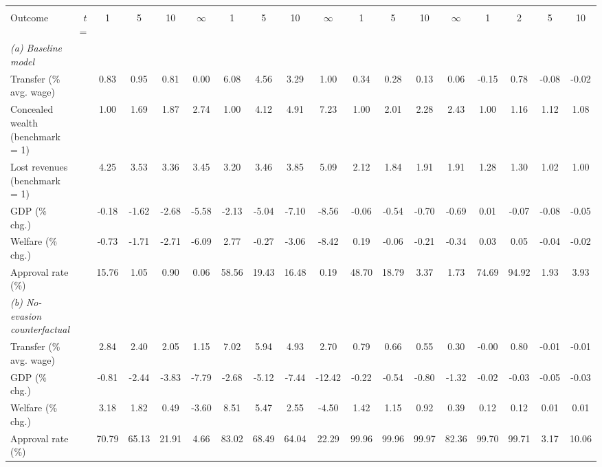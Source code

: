 \footnotesize
\renewcommand{\arraystretch}{1.2}
\begin{tabular}{lrcccccccccccccccc}
\toprule
& & &  &  & \\
\cmidrule(rl){3-6}\cmidrule(rl){7-10}\cmidrule(rl){11-14}\cmidrule(rl){15-18}
Outcome & $t$ = & 1 & 5 & 10 & $\infty$& 1 & 5 & 10 & $\infty$& 1 & 5 & 10 & $\infty$& 1 & 2 & 5 & 10\\
\midrule
\textit{(a) Baseline model}&&&&&&&&&&&&&&&&&\\
Transfer (\% avg. wage) & &0.83&0.95&0.81&0.00&6.08&4.56&3.29&1.00&0.34&0.28&0.13&0.06&-0.15&0.78&-0.08&-0.02\\
Concealed wealth (benchmark = 1) & &1.00&1.69&1.87&2.74&1.00&4.12&4.91&7.23&1.00&2.01&2.28&2.43&1.00&1.16&1.12&1.08\\
Lost revenues (benchmark = 1) & &4.25&3.53&3.36&3.45&3.20&3.46&3.85&5.09&2.12&1.84&1.91&1.91&1.28&1.30&1.02&1.00\\
GDP (\% chg.) & &-0.18&-1.62&-2.68&-5.58&-2.13&-5.04&-7.10&-8.56&-0.06&-0.54&-0.70&-0.69&0.01&-0.07&-0.08&-0.05\\
Welfare (\% chg.) & &-0.73&-1.71&-2.71&-6.09&2.77&-0.27&-3.06&-8.42&0.19&-0.06&-0.21&-0.34&0.03&0.05&-0.04&-0.02\\
Approval rate (\%) & &15.76&1.05&0.90&0.06&58.56&19.43&16.48&0.19&48.70&18.79&3.37&1.73&74.69&94.92&1.93&3.93\\
\midrule
\textit{(b) No-evasion counterfactual}&&&&&&&&&&&&&&&&&\\
Transfer (\% avg. wage) & &2.84&2.40&2.05&1.15&7.02&5.94&4.93&2.70&0.79&0.66&0.55&0.30&-0.00&0.80&-0.01&-0.01\\
GDP (\% chg.) & &-0.81&-2.44&-3.83&-7.79&-2.68&-5.12&-7.44&-12.42&-0.22&-0.54&-0.80&-1.32&-0.02&-0.03&-0.05&-0.03\\
Welfare (\% chg.) & &3.18&1.82&0.49&-3.60&8.51&5.47&2.55&-4.50&1.42&1.15&0.92&0.39&0.12&0.12&0.01&0.01\\
Approval rate (\%) & &70.79&65.13&21.91&4.66&83.02&68.49&64.04&22.29&99.96&99.96&99.97&82.36&99.70&99.71&3.17&10.06\\
\bottomrule
\end{tabular}
\normalsize
